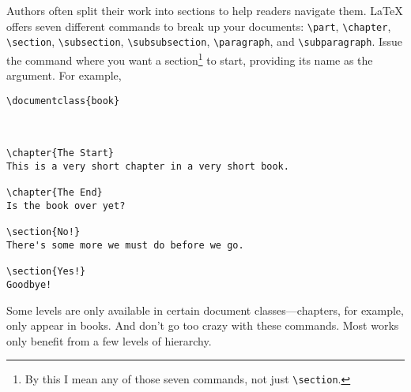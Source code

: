 Authors often split their work into sections to help readers navigate them.
\LaTeX{} offers seven different commands to break up your documents:
\verb|\part|, \verb|\chapter|, \verb|\section|, \verb|\subsection|,
\verb|\subsubsection|, \verb|\paragraph|, and \verb|\subparagraph|.
Issue the command where you want a section\footnote{By this
I mean any of those seven commands, not just \texttt{\textbackslash section}.}
to start,
providing its name as the argument.
For example,
\begin{leftfigure}
\begin{lstlisting}
\documentclass{book}



\chapter{The Start}
This is a very short chapter in a very short book.

\chapter{The End}
Is the book over yet?

\section{No!}
There's some more we must do before we go.

\section{Yes!}
Goodbye!

\end{lstlisting}
\end{leftfigure}
Some levels are only available in certain document classes---chapters,
for example, only appear in books.
And don't go too crazy with these commands.
Most works only benefit from a few levels of hierarchy.

